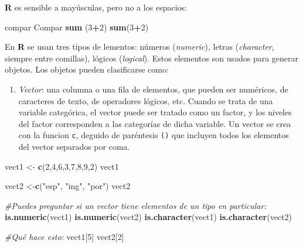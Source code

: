 \documentclass[]{article}
\newenvironment{Shaded}{\begin{snugshade}}{\end{snugshade}}
\newcommand{\CommentTok}[1]{\textcolor[rgb]{0.56,0.35,0.01}{\textit{#1}}}
\newcommand{\DecValTok}[1]{\textcolor[rgb]{0.00,0.00,0.81}{#1}}
\newcommand{\KeywordTok}[1]{\textcolor[rgb]{0.13,0.29,0.53}{\textbf{#1}}}
\newcommand{\NormalTok}[1]{#1}
\newcommand{\OperatorTok}[1]{\textcolor[rgb]{0.81,0.36,0.00}{\textbf{#1}}}
\newcommand{\StringTok}[1]{\textcolor[rgb]{0.31,0.60,0.02}{#1}}
\providecommand{\tightlist}{%
  \setlength{\itemsep}{0pt}\setlength{\parskip}{0pt}}
\begin{document}
\textbf{R} es sensible a mayúsculas, pero no a los espacios:

\begin{Shaded}
\begin{Highlighting}[]
\NormalTok{compar}
\NormalTok{Compar}
\KeywordTok{sum}\NormalTok{    (}\DecValTok{3}\OperatorTok{+}\DecValTok{2}\NormalTok{)}
\KeywordTok{sum}\NormalTok{(}\DecValTok{3}\OperatorTok{+}\DecValTok{2}\NormalTok{)}
\end{Highlighting}
\end{Shaded}

En \textbf{R} se usan tres tipos de lementos: números (\emph{numeric}),
letras (\emph{character}, siempre entre comillas), lógicos
(\emph{logical}). Estos elementos son usados para generar objetos. Los
objetos pueden clasificarse como:

\begin{enumerate}
\def\labelenumi{\Alph{enumi})}
\tightlist
\item
  \emph{Vector}: una columna o una fila de elementos, que pueden ser
  numéricos, de caracteres de texto, de operadores lógicos, etc. Cuando
  se trata de una variable categórica, el vector puede ser tratado como
  un factor, y los niveles del factor corresponden a las categorías de
  dicha variable. Un vector se crea con la funcion \texttt{c}, deguido
  de paréntesis \texttt{()} que incluyen todos los elementos del vector
  separados por coma.
\end{enumerate}

\begin{Shaded}
\begin{Highlighting}[]
\NormalTok{vect1 <-}\StringTok{ }\KeywordTok{c}\NormalTok{(}\DecValTok{2}\NormalTok{,}\DecValTok{4}\NormalTok{,}\DecValTok{6}\NormalTok{,}\DecValTok{3}\NormalTok{,}\DecValTok{7}\NormalTok{,}\DecValTok{8}\NormalTok{,}\DecValTok{9}\NormalTok{,}\DecValTok{2}\NormalTok{)}
\NormalTok{vect1}

\NormalTok{vect2 <-}\KeywordTok{c}\NormalTok{(}\StringTok{"esp"}\NormalTok{, }\StringTok{"ing"}\NormalTok{, }\StringTok{"por"}\NormalTok{)}
\NormalTok{vect2}

\CommentTok{#Puedes preguntar si un vector tiene elementos de un tipo en particular:}
\KeywordTok{is.numeric}\NormalTok{(vect1)}
\KeywordTok{is.numeric}\NormalTok{(vect2)}
\KeywordTok{is.character}\NormalTok{(vect1)}
\KeywordTok{is.character}\NormalTok{(vect2)}

\CommentTok{#Qué hace esto:}
\NormalTok{vect1[}\DecValTok{5}\NormalTok{]}
\NormalTok{vect2[}\DecValTok{2}\NormalTok{]}
\end{Highlighting}
\end{Shaded}
\end{document}
